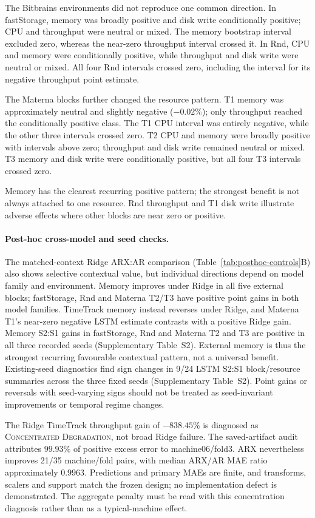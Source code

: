 \documentclass[a4paper,fleqn]{cas-dc}
\begin{document}
The Bitbrains environments did not reproduce one common direction. In
fastStorage, memory was broadly positive and disk write conditionally positive;
CPU and throughput were neutral or mixed. The memory bootstrap interval
excluded zero, whereas the near-zero throughput interval crossed it. In Rnd,
CPU and memory were conditionally positive, while throughput and disk write
were neutral or mixed. All four Rnd intervals crossed zero, including the
interval for its negative throughput point estimate.

The Materna blocks further changed the resource pattern. T1 memory was
approximately neutral and slightly negative ($-0.02\%$); only throughput
reached the conditionally positive class. The T1 CPU interval was entirely
negative, while the other three intervals crossed zero. T2 CPU and memory
were broadly positive with intervals above zero; throughput and disk write
remained neutral or mixed. T3 memory and disk write were conditionally
positive, but all four T3 intervals crossed zero.

Memory has the clearest recurring positive pattern; the strongest benefit is
not always attached to one resource. Rnd throughput and T1 disk write illustrate
adverse effects where other blocks are near zero or positive.

\paragraph{Post-hoc cross-model and seed checks.}
The matched-context Ridge ARX:AR comparison
(Table~\ref{tab:posthoc-controls}B) also shows selective contextual value,
but individual directions depend on model family and environment. Memory
improves under Ridge in all five external blocks; fastStorage, Rnd and
Materna T2/T3 have positive point gains in both model families. TimeTrack
memory instead reverses under Ridge, and Materna T1's near-zero negative
LSTM estimate contrasts with a positive Ridge gain. Memory S2:S1 gains in
fastStorage, Rnd and Materna T2 and T3 are positive in all three recorded
seeds (Supplementary Table~S2). External memory is thus
the strongest recurring favourable contextual pattern, not a universal
benefit. Existing-seed diagnostics find sign changes in 9/24 LSTM S2:S1
block/resource summaries across the three fixed seeds (Supplementary
Table~S2). Point gains or reversals with seed-varying signs should not be
treated as seed-invariant improvements or temporal regime changes.

The Ridge TimeTrack throughput gain of $-838.45\%$ is diagnosed as
\textsc{Concentrated Degradation}, not broad Ridge failure. The saved-artifact
audit attributes $99.93\%$ of positive excess error to machine06/fold3.
ARX nevertheless improves 21/35 machine/fold pairs, with median ARX/AR MAE
ratio approximately $0.9963$. Predictions and primary MAEs are finite, and
transforms, scalers and support match the frozen design; no implementation
defect is demonstrated. The aggregate penalty must be read with this
concentration diagnosis rather than as a typical-machine effect.
\end{document}
